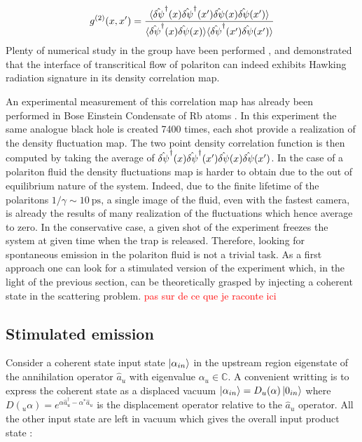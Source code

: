  \begin{equation}
    g^{(2)}(x,x')=\dfrac{\langle{\hat{\delta\psi}}^\dagger(x)\hat{\delta\psi}^\dagger(x')\hat{\delta\psi}(x)\hat{\delta\psi}(x')\rangle}{\langle \hat{\delta\psi}^\dagger(x)\hat{\delta\psi}(x)\rangle\langle \hat{\delta\psi}^\dagger(x')\hat{\delta\psi}(x')\rangle}
 \end{equation}
 Plenty of numerical study in the group have been performed \cite{jacquet_quantum_2023}, and demonstrated that the interface of transcritical 
 flow of polariton can indeed exhibits Hawking radiation signature in its density correlation map.


 An experimental measurement of this correlation map has already been performed in Bose Einstein Condensate of Rb atoms \cite{steinhauer_observation_2016}.
 In this experiment the same analogue black hole is created 7400 times, each shot provide a realization of the density fluctuation map. The two point density correlation
 function is then computed by taking the average of $\hat{\delta\psi}^\dagger(x)\hat{\delta\psi}^\dagger(x')\hat{\delta\psi}(x)\hat{\delta\psi}(x')$. 
 In the case of a polariton fluid the density fluctuations map is harder to obtain due to 
 the out of equilibrium nature of the system. Indeed, due to the finite lifetime of the polaritons $1/\gamma\sim \SI{10}{\pico \second}$, a single 
 image of the fluid, even with the fastest camera, is already the results of many realization of the fluctuations which hence average to zero. In the conservative case,
 a given shot of the experiment freezes the system at given time when the trap is released. Therefore, looking for spontaneous
 emission in the polariton fluid is not a trivial task. As a first approach one can look for a stimulated version of the experiment which, in the light of the previous section,
 can be theoretically grasped by injecting a coherent state in the scattering problem.
 \textcolor{red}{pas sur de ce que je raconte ici}

\subsection{Stimulated emission}

Consider a coherent state input state $\ket{\alpha_{in}}$ in the upstream region eigenstate of the annihilation operator $\hat{a}_u$ with eigenvalue $\alpha_u \in \mathbb{C}$.
A convenient writting is to express the coherent state as a displaced vacuum $\ket{\alpha_{in}}=D_u(\alpha)\ket{0_{in}}$ where $D(_u\alpha)=e^{\alpha \hat{a}_u^\dagger-\alpha^*\hat{a}_u}$ is the displacement operator relative to the 
$\hat{a}_u$ operator. All the other input state are left in vacuum which gives the overall input product state :

